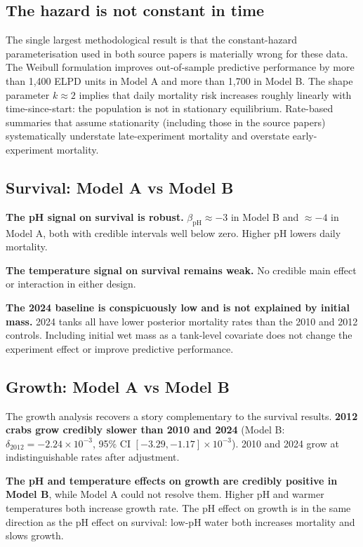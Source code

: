\documentclass[11pt]{article}
\begin{document}
\subsection{The hazard is not constant in time}
The single largest methodological result is that the constant-hazard parameterisation used in both source papers is materially wrong for these data. The Weibull formulation improves out-of-sample predictive performance by more than 1{,}400 ELPD units in Model A and more than 1{,}700 in Model B. The shape parameter $k \approx 2$ implies that daily mortality risk increases roughly linearly with time-since-start: the population is not in stationary equilibrium. Rate-based summaries that assume stationarity (including those in the source papers) systematically understate late-experiment mortality and overstate early-experiment mortality.

\subsection{Survival: Model A vs Model B}
\textbf{The pH signal on survival is robust.} $\beta_{\text{pH}} \approx -3$ in Model B and $\approx -4$ in Model A, both with credible intervals well below zero. Higher pH lowers daily mortality.

\textbf{The temperature signal on survival remains weak.} No credible main effect or interaction in either design.

\textbf{The 2024 baseline is conspicuously low and is not explained by initial mass.} 2024 tanks all have lower posterior mortality rates than the 2010 and 2012 controls. Including initial wet mass as a tank-level covariate does not change the experiment effect or improve predictive performance.

\subsection{Growth: Model A vs Model B}
The growth analysis recovers a story complementary to the survival results. \textbf{2012 crabs grow credibly slower than 2010 and 2024} (Model B: $\delta_{2012} = -2.24 \times 10^{-3}$, 95\% CI $[-3.29, -1.17] \times 10^{-3}$). 2010 and 2024 grow at indistinguishable rates after adjustment.

\textbf{The pH and temperature effects on growth are credibly positive in Model B}, while Model A could not resolve them. Higher pH and warmer temperatures both increase growth rate. The pH effect on growth is in the same direction as the pH effect on survival: low-pH water both increases mortality and slows growth.
\end{document}
